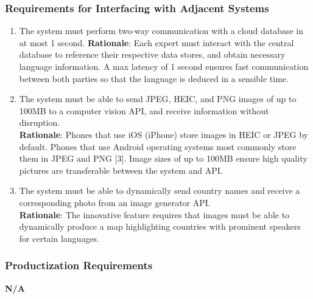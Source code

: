 \subsubsection{Requirements for Interfacing with Adjacent Systems}
\label{ssub:requirements_for_interfacing_with_adjacent_systems}
\begin{enumerate}[{OE-IA}1.]
	\item The system must perform two-way communication with a cloud database in at most 1 second.
	\textbf{Rationale}: Each expert must interact with the central database to reference their respective data stores, and obtain necessary language information. A max latency of 1 second ensures fast communication between both parties so that the language is deduced in a sensible time.   
	\item The system must be able to send JPEG, HEIC, and PNG images of up to 100MB to a computer vision API, and receive information without disruption.
	\\ \textbf{Rationale}: Phones that use iOS (iPhone) store images in HEIC or JPEG by default. Phones that use Android operating systems most commonly store them in JPEG and PNG [3]. Image sizes of up to 100MB ensure high quality pictures are transferable between the system and API.
	\item The system must be able to dynamically send country names and receive a corresponding photo from an image generator API.
	\\ \textbf{Rationale}: The innovative feature requires that images must be able to dynamically produce a map highlighting countries with prominent speakers for certain languages.
\end{enumerate}

\subsubsection{Productization Requirements}
\label{ssub:productization_requirements}
\textbf{N/A}

